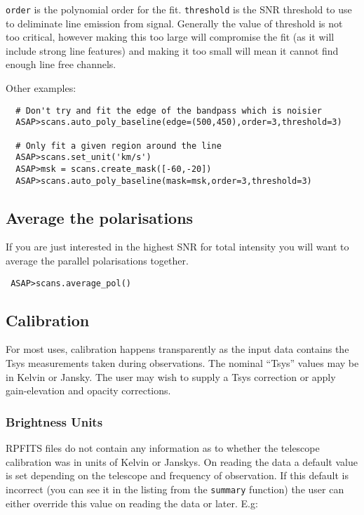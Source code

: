 \documentclass[11pt]{article}
\newcommand{\cmd}[1]{{\tt #1}}
\begin{document}
\cmd{order} is the polynomial order for the fit. \cmd{threshold} is
the SNR threshold to use to deliminate line emission from
signal. Generally the value of threshold is not too critical, however
making this too large will compromise the fit (as it will include
strong line features) and making it too small will mean it cannot find
enough line free channels.


Other examples:

\begin{verbatim}
  # Don't try and fit the edge of the bandpass which is noisier
  ASAP>scans.auto_poly_baseline(edge=(500,450),order=3,threshold=3)

  # Only fit a given region around the line
  ASAP>scans.set_unit('km/s')
  ASAP>msk = scans.create_mask([-60,-20])
  ASAP>scans.auto_poly_baseline(mask=msk,order=3,threshold=3)

\end{verbatim}

\subsection{Average the polarisations}

If you are just interested in the highest SNR for total intensity you
will want to average the parallel polarisations together.

\begin{verbatim}
 ASAP>scans.average_pol()
\end{verbatim}

\subsection{Calibration}

For most uses, calibration happens transparently as the input data
contains the Tsys measurements taken during observations. The nominal
``Tsys'' values may be in Kelvin or Jansky. The user may wish to
supply a Tsys correction or apply gain-elevation and opacity
corrections.

\subsubsection{Brightness Units}

RPFITS files do not contain any information as
to whether the telescope calibration was in units of Kelvin or
Janskys.  On reading the data a default value is set depending on the
telescope and frequency of observation.  If this default is incorrect
(you can see it in the listing from the \cmd{summary} function) the
user can either override this value on reading the data or later.
E.g:
\end{document}
